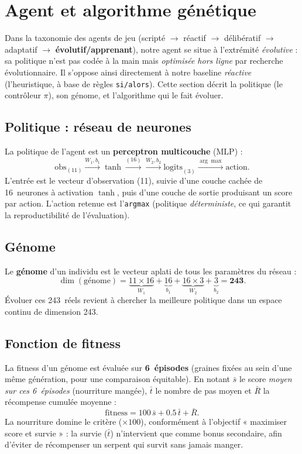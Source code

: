 \documentclass[11pt,a4paper]{article}
\begin{document}
\section{Agent et algorithme génétique}

Dans la taxonomie des agents de jeu (scripté $\to$ réactif $\to$ délibératif $\to$
adaptatif $\to$ \textbf{évolutif/apprenant}), notre agent se situe à l'extrémité
\emph{évolutive} : sa politique n'est pas codée à la main mais \emph{optimisée
hors ligne} par recherche évolutionnaire. Il s'oppose ainsi directement à notre
baseline \emph{réactive} (l'heuristique, à base de règles \texttt{si/alors}). Cette
section décrit la politique (le contrôleur $\pi$), son génome, et l'algorithme qui
le fait évoluer.

\subsection{Politique : réseau de neurones}
La politique de l'agent est un \textbf{perceptron multicouche} (MLP) :
\[
\text{obs}_{(11)} \xrightarrow{W_1, b_1} \tanh \xrightarrow{(16)} \xrightarrow{W_2, b_2} \text{logits}_{(3)} \xrightarrow{\arg\max} \text{action}.
\]
L'entrée est le vecteur d'observation (11), suivie d'une couche cachée de
16~neurones à activation $\tanh$, puis d'une couche de sortie produisant un score
par action. L'action retenue est l'\texttt{argmax} (politique \emph{déterministe},
ce qui garantit la reproductibilité de l'évaluation).

\subsection{Génome}
Le \textbf{génome} d'un individu est le vecteur aplati de tous les paramètres du
réseau :
\[
\dim(\text{génome}) = \underbrace{11\times16}_{W_1} + \underbrace{16}_{b_1}
+ \underbrace{16\times3}_{W_2} + \underbrace{3}_{b_2} = \mathbf{243}.
\]
Évoluer ces 243~réels revient à chercher la meilleure politique dans un espace
continu de dimension 243.

\subsection{Fonction de fitness}
La fitness d'un génome est évaluée sur \textbf{6~épisodes} (graines fixées au sein
d'une même génération, pour une comparaison équitable). En notant $\bar s$ le
score \emph{moyen sur ces 6~épisodes} (nourriture mangée), $\bar t$ le nombre de
pas moyen et $\bar R$ la récompense cumulée moyenne :
\[
\text{fitness} = 100\,\bar s + 0.5\,\bar t + \bar R.
\]
La nourriture domine le critère ($\times 100$), conformément à l'objectif
« maximiser score et survie » : la survie ($\bar t$) n'intervient que comme bonus
secondaire, afin d'éviter de récompenser un serpent qui survit sans jamais manger.
\end{document}
